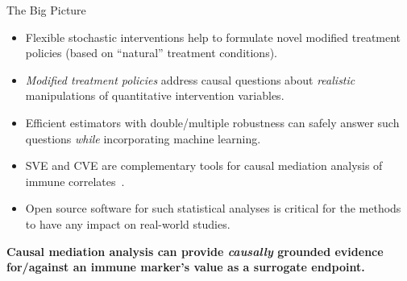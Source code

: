 \documentclass{beamer}
\begin{document}



\begin{frame}[c]{The Big Picture}

\small
\begin{center}
\begin{itemize}
  \itemsep3pt
  \item Flexible stochastic interventions help to formulate novel modified
    treatment policies (based on ``natural'' treatment conditions).
  \item \textit{Modified treatment policies} address causal questions about
    \textit{realistic} manipulations of quantitative intervention variables.
  \item Efficient estimators with double/multiple robustness can safely answer
    such questions \textit{while} incorporating machine learning.
  \item SVE and CVE are complementary tools for causal mediation analysis of
    immune correlates~\citep{gilbert2024four}.
  \item Open source software for such statistical analyses is critical for the
    methods to have any impact on real-world studies.
\end{itemize}
\end{center}

\vspace{0.25em}
\alert{\textbf{Causal mediation analysis can provide \textit{causally} grounded
evidence for/against an immune marker's value as a surrogate endpoint.}}

\note{
}

\end{frame}

\end{document}
